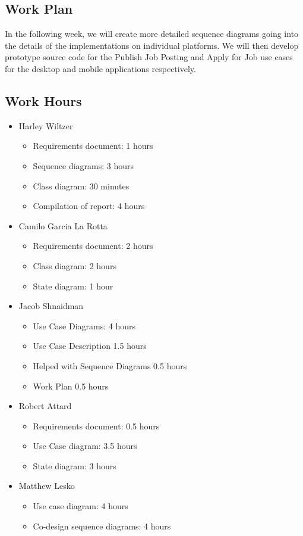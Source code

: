 \documentclass[12pt,openany]{report}
\begin{document}
\begin{enumerate}
\begin{itemize}
        \end{itemize}
\end{enumerate}

\subsection*{Work Plan}

In the following week, we will create more detailed sequence diagrams going into the details of the implementations on individual platforms. We will then develop prototype source code for the Publish Job Posting and Apply for Job use cases for the desktop and mobile applications respectively.

\subsection*{Work Hours}

\begin{itemize}
    \item Harley Wiltzer
		\begin{itemize}
			\item Requirements document: 1 hours
			\item Sequence diagrams: 3 hours
			\item Class diagram: 30 minutes
			\item Compilation of report: 4 hours
		\end{itemize}
    \item Camilo Garcia La Rotta
    \begin{itemize}
        \item Requirements document: 2 hours
        \item Class diagram: 2 hours
        \item State diagram: 1 hour
    \end{itemize}
    \item Jacob Shnaidman
    \begin{itemize}
        \item Use Case Diagrams: 4 hours
        \item Use Case Description 1.5 hours
		\item Helped with Sequence Diagrams 0.5 hours
		\item Work Plan 0.5 hours
    \end{itemize}
    \item Robert Attard
    \begin{itemize}
        \item Requirements document: 0.5 hours
        \item Use Case diagram: 3.5 hours
        \item State diagram: 3 hours
    \end{itemize}
    \item Matthew Lesko
    \begin{itemize}
    	\item Use case diagram: 4 hours
    	\item Co-design sequence diagrams: 4 hours
    \end{itemize}
\end{itemize}
\end{document}
